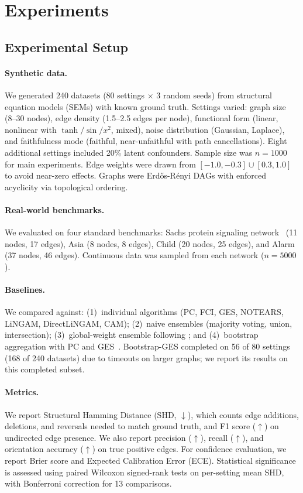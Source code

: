 \documentclass{article}
\begin{document}
\section{Experiments}
\label{sec:experiments}

\subsection{Experimental Setup}

\paragraph{Synthetic data.}
We generated 240 datasets (80 settings $\times$ 3 random seeds) from structural equation models (SEMs) with known ground truth.
Settings varied: graph size (8--30 nodes), edge density (1.5--2.5 edges per node), functional form (linear, nonlinear with $\tanh/\sin/x^2$, mixed), noise distribution (Gaussian, Laplace), and faithfulness mode (faithful, near-unfaithful with path cancellations).
Eight additional settings included 20\% latent confounders.
Sample size was $n=1000$ for main experiments.
Edge weights were drawn from $[-1.0, -0.3] \cup [0.3, 1.0]$ to avoid near-zero effects.
Graphs were Erd\H{o}s-R\'{e}nyi DAGs with enforced acyclicity via topological ordering.

\paragraph{Real-world benchmarks.}
We evaluated on four standard benchmarks: Sachs protein signaling network~\citep{sachs2005causal} (11 nodes, 17 edges), Asia (8 nodes, 8 edges), Child (20 nodes, 25 edges), and Alarm (37 nodes, 46 edges).
Continuous data was sampled from each network ($n=5000$).

\paragraph{Baselines.}
We compared against: (1)~individual algorithms (PC, FCI, GES, NOTEARS, LiNGAM, DirectLiNGAM, CAM); (2)~naive ensembles (majority voting, union, intersection); (3)~global-weight ensemble following \citet{saldanha2020evaluation}; and (4)~bootstrap aggregation with PC and GES~\citep{debeire2024bootstrap}.
Bootstrap-GES completed on 56 of 80 settings (168 of 240 datasets) due to timeouts on larger graphs; we report its results on this completed subset.

\paragraph{Metrics.}
We report Structural Hamming Distance (SHD, $\downarrow$), which counts edge additions, deletions, and reversals needed to match ground truth, and F1 score ($\uparrow$) on undirected edge presence. We also report precision ($\uparrow$), recall ($\uparrow$), and orientation accuracy ($\uparrow$) on true positive edges.
For confidence evaluation, we report Brier score and Expected Calibration Error (ECE).
Statistical significance is assessed using paired Wilcoxon signed-rank tests on per-setting mean SHD, with Bonferroni correction for 13 comparisons.
\end{document}
